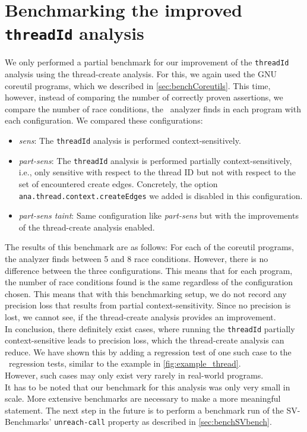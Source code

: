   \section{Benchmarking the improved \texttt{threadId} analysis}
    We only performed a partial benchmark for our improvement of the \texttt{threadId} analysis using the thread-create analysis. For this, we again used the GNU coreutil programs, which we described in \autoref{sec:benchCoreutils}. This time, however, instead of comparing the number of correctly proven assertions, we compare the number of race conditions, the \gob\ analyzer finds in each program with each configuration. We compared these configurations:
    \begin{itemize}
      \item \textit{sens}: The \texttt{threadId} analysis is performed context-sensitively.
      \item \textit{part-sens}: The \texttt{threadId} analysis is performed partially context-sensitively, i.e., only sensitive with respect to the thread ID but not with respect to the set of encountered create edges. Concretely, the option \texttt{ana.thread.context.createEdges} we added is disabled in this configuration.
      \item \textit{part-sens taint}: Same configuration like \textit{part-sens} but with the improvements of the thread-create analysis enabled.
    \end{itemize}
    The results of this benchmark are as follows: For each of the coreutil programs, the analyzer finds between 5 and 8 race conditions. However, there is no difference between the three configurations. This means that for each program, the number of race conditions found is the same regardless of the configuration chosen. This means that with this benchmarking setup, we do not record any precision loss that results from partial context-sensitivity. Since no precision is lost, we cannot see, if the thread-create analysis provides an improvement.
    \\
    In conclusion, there definitely exist cases, where running the \texttt{threadId} partially context-sensitive leads to precision loss, which the thread-create analysis can reduce. We have shown this by adding a regression test of one such case to the \gob\ regression tests, similar to the example in \autoref{fig:example_thread}.\\
    However, such cases may only exist very rarely in real-world programs.\\
    It has to be noted that our benchmark for this analysis was only very small in scale. More extensive benchmarks are necessary to make a more meaningful statement. The next step in the future is to perform a benchmark run of the SV-Benchmarks' \texttt{unreach-call} property as described in \autoref{sec:benchSVbench}.
